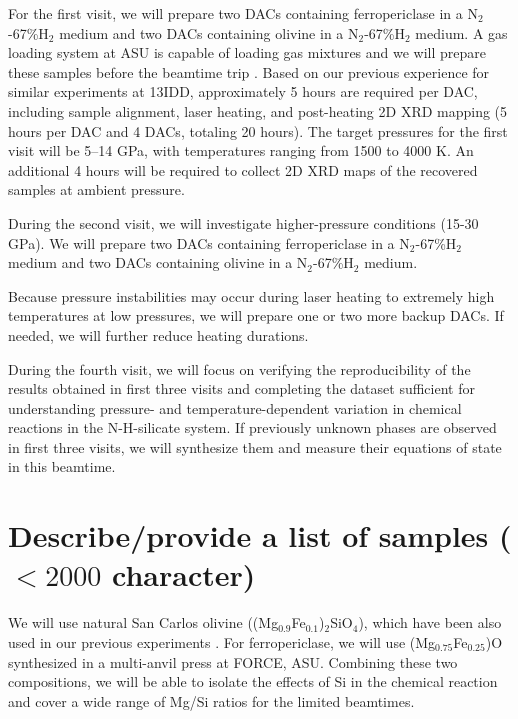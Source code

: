 For the first visit, we will prepare two DACs containing ferropericlase in a N$_2$-67\%H$_2$ medium and two DACs containing olivine in a N$_2$-67\%H$_2$ medium. 
A gas loading system at ASU is capable of loading gas mixtures and we will prepare these samples before the beamtime trip \cite{fu_Core_2023}.
Based on our previous experience for similar experiments at 13IDD, approximately 5 hours are required per DAC, including sample alignment, laser heating, and post-heating 2D XRD mapping (5 hours per DAC and 4 DACs, totaling 20 hours). 
The target pressures for the first visit will be 5--14 GPa, with temperatures ranging from 1500 to 4000 K. 
An additional 4 hours will be required to collect 2D XRD maps of the recovered samples at ambient pressure.

During the second visit, we will investigate higher-pressure conditions (15-30 GPa). 
We will prepare two DACs containing ferropericlase in a N$_2$-67\%H$_2$ medium and two DACs containing olivine in a N$_2$-67\%H$_2$ medium. 

Because pressure instabilities may occur during laser heating to extremely high temperatures at low pressures, we will prepare one or two more backup DACs. 
If needed, we will further reduce heating durations. 

During the fourth visit, we will focus on verifying the reproducibility of the results obtained in first three visits and completing the dataset sufficient for understanding pressure- and temperature-dependent variation in chemical reactions in the N-H-silicate system. 
If previously unknown phases are observed in first three visits, we will synthesize them and measure their equations of state in this beamtime.


\section{Describe/provide a list of samples ($<2000$ character)} 


We will use natural San Carlos olivine ((Mg$_{0.9}$Fe$_{0.1}$)$_2$SiO$_4$), which have been also used in our previous experiments \cite{kim_Atomicscale_2021, kim_Solubility_2022}. 
For ferropericlase, we will use (Mg$_{0.75}$Fe$_{0.25}$)O synthesized in a multi-anvil press at FORCE, ASU. 
Combining these two compositions, we will be able to isolate the effects of Si in the chemical reaction and cover a wide range of Mg/Si ratios for the limited beamtimes.

